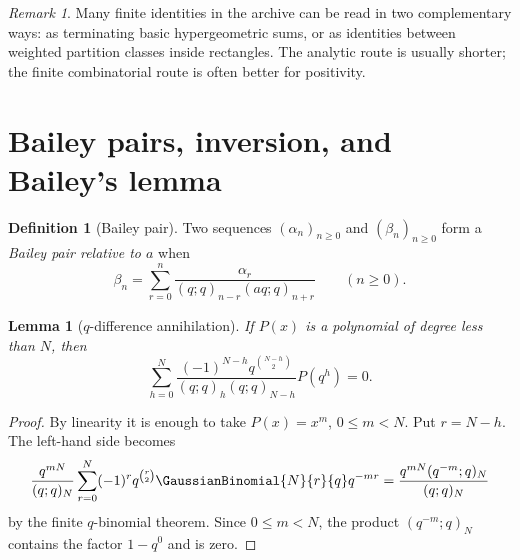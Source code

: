 \documentclass[11pt]{article}
\numberwithin{equation}{section}
\newtheorem{lemma}[theorem]{Lemma}
\theoremstyle{definition}
\newtheorem{definition}[theorem]{Definition}
\theoremstyle{remark}
\newtheorem{remark}[theorem]{Remark}
\begin{document}
\begin{remark}
Many finite identities in the archive can be read in two complementary ways:
as terminating basic hypergeometric sums, or as identities between weighted
partition classes inside rectangles.  The analytic route is usually shorter;
the finite combinatorial route is often better for positivity.
\end{remark}

\section{Bailey pairs, inversion, and Bailey's lemma}

\begin{definition}[Bailey pair]
Two sequences $(\alpha_n)_{n\ge0}$ and $(\beta_n)_{n\ge0}$ form a
\emph{Bailey pair relative to $a$} when
\begin{equation}\label{eq:baileypair}
\beta_n=\sum_{r=0}^n
\frac{\alpha_r}{(q;q)_{n-r}(aq;q)_{n+r}}
\qquad(n\ge0).
\end{equation}
\end{definition}

\begin{lemma}[$q$-difference annihilation]\label{lem:qdiff}
If $P(x)$ is a polynomial of degree less than $N$, then
\begin{equation}\label{eq:qdiff}
\sum_{h=0}^N
\frac{(-1)^{N-h}q^{\binom{N-h}{2}}}{(q;q)_h(q;q)_{N-h}}
P(q^h)=0.
\end{equation}
\end{lemma}
\begin{proof}
By linearity it is enough to take $P(x)=x^m$, $0\le m<N$.  Put $r=N-h$.
The left-hand side becomes
\[
\frac{q^{mN}}{(q;q)_N}
\sum_{r=0}^N(-1)^rq^{\binom r2}\GaussianBinomial{N}{r}{q} q^{-mr}
=\frac{q^{mN}(q^{-m};q)_N}{(q;q)_N}
\]
by the finite $q$-binomial theorem.  Since $0\le m<N$, the product
$(q^{-m};q)_N$ contains the factor $1-q^0$ and is zero.
\end{proof}
\end{document}
